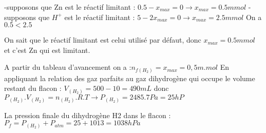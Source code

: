 \documentclass[12pt]{article}
\begin{document}
-supposons que Zn est le réactif limitant : $0.5 - x_{max} = 0 \rightarrow x_{max} = 0.5mmol$
-supposons que $H^+$ est le réactif limitant : $5-2x_{max} = 0 \rightarrow x_{max} = 2.5mmol$
 On a  $0.5 < 2.5$

On sait que le réactif limitant est celui utilisé par défaut, donc $x_{max} = 0.5mmol$ et c’est Zn qui est limitant.

A partir du tableau d’avancement on a :$ n_{f(H_2)} =x_{max}=0,5m.mol$
En appliquant la relation des gaz parfaits au gaz dihydrogène qui occupe le volume restant du flacon :
$V_{(H_2)}=500-10=490mL$ donc $P_{(H_2)}.V_{(H_2)} = n_{(H_2)}.R.T \rightarrow P_{(H_2)} = 2485.7Pa = 25hP
$

La pression finale du dihydrogène H2 dans le flacon : $P_f = P_{(H_2)} + P_{atm}  = 25 + 1013 = 1038hPa$
\end{document}
